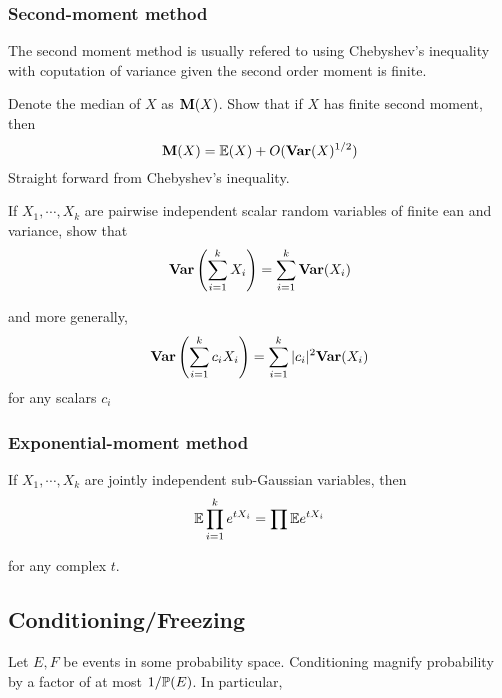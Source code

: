 \subsubsection{Second-moment method}

The second moment method is usually refered to using Chebyshev's inequality with coputation of variance given the second order moment is finite.

\begin{example}
    Denote the median of $X$ as $\mathbf{M}(X)$. Show that if $X$ has finite second moment, then 
    \begin{equation}
        \mathbf{M}(X) = \mathbb{E} (X) +O(\mathbf{Var}(X)^{1/2})
    \end{equation}
    Straight forward from Chebyshev's inequality.
\end{example}

\begin{theorem}
    If $X_1 ,\cdots ,X_k$ are pairwise independent scalar random variables of finite ean and variance, show that 
    \begin{equation}
        \mathbf{Var} \left(\sum_{i=1}^k X_i\right)=\sum_{i=1}^k \mathbf{Var}(X_i)
    \end{equation}

    and more generally, 
    \begin{equation}
        \mathbf{Var} \left(\sum_{i=1}^k c_iX_i\right)=\sum_{i=1}^k |c_i|^2\mathbf{Var}(X_i)
    \end{equation}
    for any scalars $c_i$
\end{theorem}

\subsubsection{Exponential-moment method}

If $X_1,\cdots,X_k$ are jointly independent sub-Gaussian variables, then
\begin{equation}
    \mathbb{E} \prod_{i=1}^k e^{tX_i} = \prod \mathbb{E} e^{tX_i}
\end{equation}

for any complex $t$.

\subsection{Conditioning/Freezing}

Let $E,F$ be events in some probability space. Conditioning magnify probability by a factor of at most $1/\mathbb{P}(E)$. In particular,

